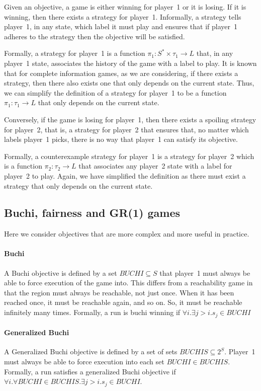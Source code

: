 \documentclass[a4paper,twoside,openright,11pt]{book}
\theoremstyle{definition}
\begin{document}
Given an objective, a game is either winning for player~1 or it is losing. If it is winning, then there exists a strategy for player~1. Informally, a strategy tells player~1, in any state, which label it must play and ensures that if player~1 adheres to the strategy then the objective will be satisfied.

Formally, a strategy for player~1 is a function $\pi_1 : S^* \times \tau_1 \rightarrow L$ that, in any player~1 state, associates the history of the game with a label to play. It is known that for complete information games, as we are considering, if there exists a strategy, then there also exists one that only depends on the current state. Thus, we can simplify the definition of a strategy for player~1 to be a function $\pi_1 : \tau_1 \rightarrow L$ that only depends on the current state.

Conversely, if the game is losing for player~1, then there exists a spoiling strategy for player~2, that is, a strategy for player~2 that ensures that, no matter which labels player~1 picks, there is no way that player~1 can satisfy its objective.

Formally, a counterexample strategy for player~1 is a strategy for player~2 which is a function $\pi_2 : \tau_2 \rightarrow L$ that associates any player~2 state with a label for player~2 to play. Again, we have simplified the definition as there must exist a strategy that only depends on the current state. 

\subsection{Buchi, fairness and GR(1) games}
Here we consider objectives that are more complex and more useful in practice.

\paragraph{Buchi}
A Buchi objective is defined by a set $BUCHI \subseteq S$ that player~1 must always be able to force execution of the game into. This differs from a reachability game in that the region must always be reachable, not just once. When it has been reached once, it must be reachable again, and so on. So, it must be reachable infinitely many times. Formally, a run is buchi winning if $\forall i. \exists j>i. s_j \in BUCHI$

\paragraph{Generalized Buchi}
A Generalized Buchi objective is defined by a set of sets $BUCHIS \subseteq 2^S$. Player~1 must always be able to force execution into each set $BUCHI \in BUCHIS$. Formally, a run satisfies a generalized Buchi objective if $\forall i. \forall BUCHI \in BUCHIS. \exists j>i. s_j \in BUCHI$.
\end{document}
